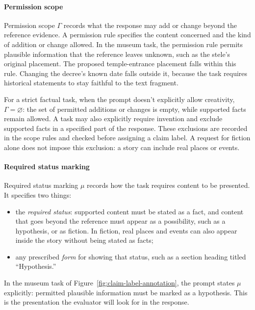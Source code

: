 \documentclass{clv2025}
\begin{document}
\paragraph{Permission scope}
Permission scope $\Gamma$ records what the response may add or change beyond
the reference evidence. A permission rule specifies the content concerned
and the kind of addition or change allowed. In the museum task, the permission rule permits
plausible information that the reference leaves unknown, such as the
stele's original placement. The proposed temple-entrance placement falls
within this rule. Changing the decree's known date falls outside it,
because the task requires historical statements to stay faithful to the
text fragment.

For a strict factual task, when the prompt doesn't explicitly allow creativity, $\Gamma=\varnothing$: the set of permitted
additions or changes is empty, while supported facts remain allowed.
A task may also explicitly require invention and exclude supported facts
in a specified part of the response. These exclusions are recorded in the
scope rules and checked before assigning a claim label. A request for
fiction alone does not impose this exclusion: a story can include real
places or events.

\paragraph{Required status marking}
Required status marking $\mu$ records how the task requires content to be
presented. It specifies two things:
\begin{itemize}
\item the \emph{required status}: supported content must be stated as a
fact, and content that goes beyond the reference must appear as a
possibility, such as a hypothesis, or as fiction. In fiction, real places
and events can also appear inside the story without being stated as facts;
\item any prescribed \emph{form} for showing that status, such as a section
heading titled ``Hypothesis.''
\end{itemize}
In the museum task of Figure~\ref{fig:claim-label-annotation}, the prompt
states $\mu$ explicitly: permitted plausible information must be marked as
a hypothesis. This is the presentation the evaluator will look for in the
response.
\end{document}

